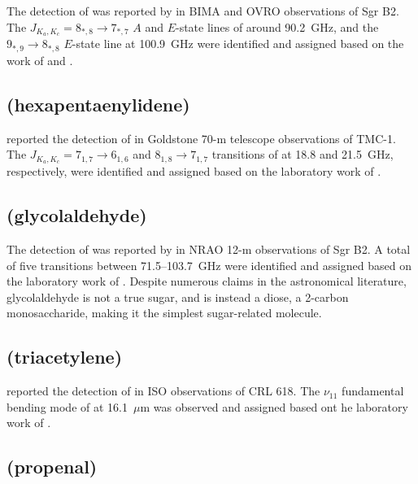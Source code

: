 \documentclass[twocolumn]{aastex631}
\begin{document}
	The detection of  was reported by \citet{Mehringer:1997vk} in BIMA and OVRO observations of Sgr B2.  The $J_{K_a,K_c} = 8_{*,8}\rightarrow7_{*,7}$ $A$ and $E$-state lines of  around 90.2~GHz, and the $9_{*,9}\rightarrow8_{*,8}$ $E$-state line at 100.9~GHz were identified and assigned based on the work of \citet{Tabor:1957ck} and \citet{Wlodarczak:1988qz}. 
	
	\subsection{ (hexapentaenylidene)}
	\label{H2C6}
	
	\citet{Langer:1997hk} reported the detection of  in Goldstone 70-m telescope observations of TMC-1.  The $J_{K_a,K_c} = 7_{1,7}\rightarrow6_{1,6}$ and $8_{1,8}\rightarrow7_{1,7}$ transitions of  at 18.8 and 21.5~GHz, respectively, were identified and assigned based on the laboratory work of \citet{McCarthy:1997ee}.
	
	\subsection{ (glycolaldehyde)}
	\label{glycolaldehyde}
	
	The detection of  was reported by \citet{Hollis:2000gn} in NRAO 12-m observations of Sgr B2.  A total of five transitions between 71.5--103.7~GHz were identified and assigned based on the laboratory work of \citet{Marstokk:1973hl}.  Despite numerous claims in the astronomical literature, glycolaldehyde is not a true sugar, and is instead a diose, a 2-carbon monosaccharide, making it the simplest sugar-related molecule.
	
	\subsection{ (triacetylene)}
	\label{HC6H}
	
	\citet{Cernicharo:2001mw} reported the detection of  in ISO observations of CRL 618.  The $\nu_{11}$ fundamental bending mode of  at 16.1~$\mu$m was observed and assigned based ont he laboratory work of \citet{Haas:1994bt}.
	
	\subsection{ (propenal)}
	\label{CH2CHCHO}
	
\end{document}

